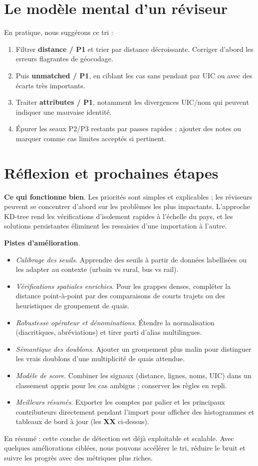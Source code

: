 \section{Le modèle mental d'un réviseur}
En pratique, nous suggérons ce tri :
\begin{enumerate}
  \item Filtrer \textbf{distance / P1} et trier par distance décroissante. Corriger d'abord les erreurs flagrantes de géocodage.
  \item Puis \textbf{unmatched / P1}, en ciblant les cas sans pendant par UIC ou avec des écarts très importants.
  \item Traiter \textbf{attributes / P1}, notamment les divergences UIC/nom qui peuvent indiquer une mauvaise identité.
  \item Épurer les seaux P2/P3 restants par passes rapides ; ajouter des notes ou marquer comme cas limites acceptés si pertinent.
\end{enumerate}

\section{Réflexion et prochaines étapes}
\textbf{Ce qui fonctionne bien}. Les priorités sont simples et explicables ; les réviseurs peuvent se concentrer d'abord sur les problèmes les plus impactants. L'approche KD-tree rend les vérifications d'isolement rapides à l'échelle du pays, et les solutions persistantes éliminent les ressaisies d'une importation à l'autre.

\textbf{Pistes d'amélioration}.
\begin{itemize}
  \item \emph{Calibrage des seuils}. Apprendre des seuils à partir de données labellisées ou les adapter au contexte (urbain vs rural, bus vs rail).
  \item \emph{Vérifications spatiales enrichies}. Pour les grappes denses, compléter la distance point-à-point par des comparaisons de courts trajets ou des heuristiques de groupement de quais.
  \item \emph{Robustesse opérateur et dénominations}. Étendre la normalisation (diacritiques, abréviations) et tirer parti d'alias multilingues.
  \item \emph{Sémantique des doublons}. Ajouter un groupement plus malin pour distinguer les vrais doublons d'une multiplicité de quais attendue.
  \item \emph{Modèle de score}. Combiner les signaux (distance, lignes, noms, UIC) dans un classement appris pour les cas ambigus ; conserver les règles en repli.
  \item \emph{Meilleurs résumés}. Exporter les comptes par palier et les principaux contributeurs directement pendant l'import pour afficher des histogrammes et tableaux de bord à jour (les \textbf{XX} ci-dessus).
\end{itemize}

\noindent En résumé : cette couche de détection est déjà exploitable et scalable. Avec quelques améliorations ciblées, nous pouvons accélérer le tri, réduire le bruit et suivre les progrès avec des métriques plus riches.
